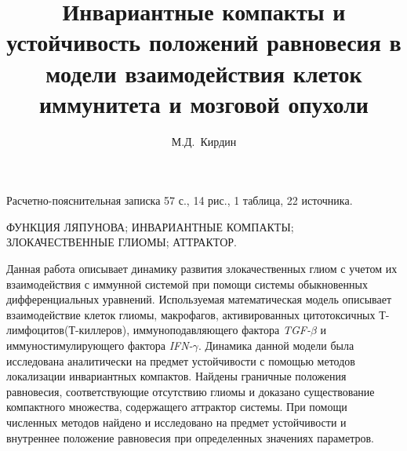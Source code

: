 \documentclass[14pt,a4paper]{extarticle}
\title{Инвариантные компакты и устойчивость положений равновесия в модели взаимодействия клеток иммунитета и мозговой опухоли}
\author{М.Д.~Кирдин}
\begin{document}
	\maketitle
	
	\begin{annotation}
	Расчетно-пояснительная записка 57 с., 14 рис., 1 таблица, 22  источника.
	
	\MakeUppercase{функция Ляпунова; инвариантные компакты; злокачественные глиомы; аттрактор.}
	
	Данная работа описывает динамику развития злокачественных глиом с учетом их взаимодействия с иммунной системой при помощи системы обыкновенных дифференциальных уравнений. Используемая математическая модель описывает взаимодействие клеток глиомы, макрофагов, активированных цитотоксичных Т-лимфоцитов(Т-киллеров), иммуноподавляющего фактора \textit{TGF-}$\beta$ и иммуностимулирующего фактора \textit{IFN-}$\gamma$. Динамика данной модели была исследована аналитически на предмет устойчивости с помощью методов локализации инвариантных компактов. Найдены граничные положения равновесия, соответствующие отсутствию глиомы и доказано существование компактного множества, содержащего аттрактор системы. При помощи численных методов найдено и исследовано на предмет устойчивости и внутреннее положение равновесия при определенных значениях параметров.
	\end{annotation}
	
	\tableofcontents
	
\end{document}
